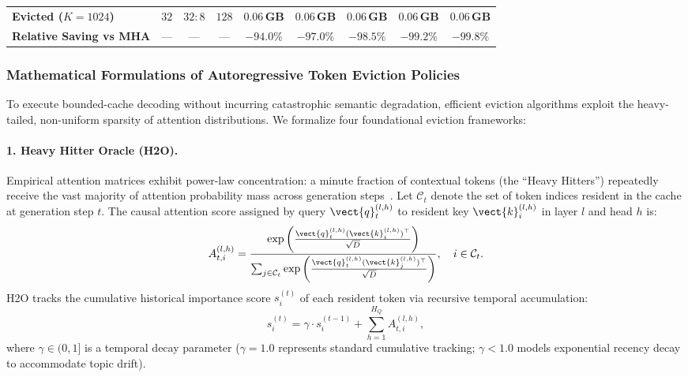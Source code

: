 \begin{table}[t]
{\begin{tabular}{l c c c c c c c c}
\midrule
\textbf{\neuralops{} Evicted ($K{=}1024$)} & $32$ & $32 : 8$ & $128$ & $\mathbf{0.06\,\text{GB}}$ & $\mathbf{0.06\,\text{GB}}$ & $\mathbf{0.06\,\text{GB}}$ & $\mathbf{0.06\,\text{GB}}$ & $\mathbf{0.06\,\text{GB}}$ \\
\textbf{Relative Saving vs MHA}   & —    & —         & —     & $\mathbf{-94.0\%}$ & $\mathbf{-97.0\%}$ & $\mathbf{-98.5\%}$ & $\mathbf{-99.2\%}$ & $\mathbf{-99.8\%}$ \\
\bottomrule
\end{tabular}%
}
\end{table}

\subsubsection{Mathematical Formulations of Autoregressive Token Eviction Policies}
\label{sec:results_kv_eviction_formulations}

To execute bounded-cache decoding without incurring catastrophic semantic degradation, efficient eviction algorithms exploit the heavy-tailed, non-uniform sparsity of attention distributions. We formalize four foundational eviction frameworks:

\paragraph{1. Heavy Hitter Oracle (\textsc{H2O}).}
Empirical attention matrices exhibit power-law concentration: a minute fraction of contextual tokens (the ``Heavy Hitters'') repeatedly receive the vast majority of attention probability mass across generation steps~\cite{zhang2024h2o}. Let $\mathcal{C}_t$ denote the set of token indices resident in the cache at generation step $t$. The causal attention score assigned by query $\vect{q}_t^{(l, h)}$ to resident key $\vect{k}_i^{(l, h)}$ in layer $l$ and head $h$ is:
\begin{equation}
\label{eq:h2o_softmax_score}
A_{t, i}^{(l, h)} = \frac{\exp\left( \frac{\vect{q}_t^{(l, h)} (\vect{k}_i^{(l, h)})^\top}{\sqrt{D}} \right)}{\sum_{j \in \mathcal{C}_t} \exp\left( \frac{\vect{q}_t^{(l, h)} (\vect{k}_j^{(l, h)})^\top}{\sqrt{D}} \right)}, \quad i \in \mathcal{C}_t.
\end{equation}
\textsc{H2O} tracks the cumulative historical importance score $s_i^{(t)}$ of each resident token via recursive temporal accumulation:
\begin{equation}
\label{eq:h2o_score_update}
s_i^{(t)} = \gamma \cdot s_i^{(t-1)} + \sum_{h=1}^{H_Q} A_{t, i}^{(l, h)},
\end{equation}
where $\gamma \in (0, 1]$ is a temporal decay parameter ($\gamma = 1.0$ represents standard cumulative tracking; $\gamma < 1.0$ models exponential recency decay to accommodate topic drift). 

